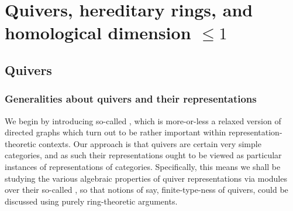\section{Quivers, hereditary rings, and homological dimension \texorpdfstring{$\leq 1$}{}}
    \subsection{Quivers}
        \subsubsection{Generalities about quivers and their representations}
            We begin by introducing so-called , which is more-or-less a relaxed version of directed graphs which turn out to be rather important within representation-theoretic contexts. Our approach is that quivers are certain very simple categories, and as such their representations ought to be viewed as particular instances of representations of categories. Specifically, this means we shall be studying the various algebraic properties of quiver representations via modules over their so-called , so that notions of say, finite-type-ness of quivers, could be discussed using purely ring-theoretic arguments.
        
